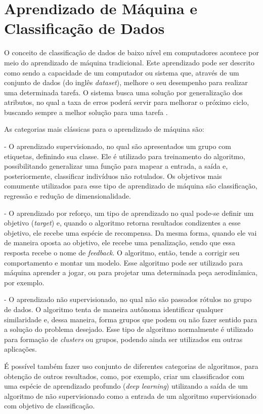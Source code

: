 \documentclass[
12pt,        %
oneside,     %
a4paper,     %
english,       %
brazil        %
%
%
]{ppgca}
\begin{document}
\section{Aprendizado de Máquina e Classificação de Dados}

O conceito de classificação de dados de baixo nível em computadores acontece por meio do aprendizado de máquina tradicional. Este aprendizado pode ser descrito como sendo a capacidade de um computador ou sistema que, através de um conjunto de dados (do inglês \textit{dataset}), melhore o seu desempenho para realizar uma determinada tarefa. O sistema busca uma solução por generalização dos atributos, no qual a taxa de erros poderá servir para melhorar o próximo ciclo, buscando sempre a melhor solução para uma tarefa \cite{mitchell1997machine}.

As categorias mais clássicas para o aprendizado de máquina são:

- O aprendizado supervisionado, no qual são apresentados um grupo com etiquetas, definindo sua classe. Ele é utilizado para treinamento do algoritmo, possibilitando generalizar uma função para mapear a entrada, a saída e, posteriormente, classificar indivíduos não rotulados. Os objetivos mais comumente utilizados para esse tipo de aprendizado de máquina são classificação, regressão e redução de dimensionalidade.

- O aprendizado por reforço, um tipo de aprendizado no qual pode-se definir um objetivo (\textit{target}) e, quando o algoritmo retorna resultados condizentes a esse objetivo, ele recebe uma espécie de recompensa. Da mesma forma, quando ele vai de maneira oposta ao objetivo, ele recebe uma penalização, sendo que essa resposta recebe o nome de \textit{feedback}. O algoritmo, então, tende a corrigir seu comportamento e montar um modelo. Esse algoritmo pode ser utilizado para máquina aprender a jogar, ou para projetar uma determinada peça aerodinâmica, por exemplo.

- O aprendizado não supervisionado, no qual não são passados rótulos no grupo de dados. O algoritmo tenta de maneira autônoma identificar qualquer similaridade e, dessa maneira, forma grupos que podem ou não fazer sentido para a solução do problema desejado. Esse tipo de algoritmo normalmente é utilizado para formação de \textit{clusters} ou grupos, podendo ainda ser utilizados em outras aplicações.

É possível também fazer uso conjunto de diferentes categorias de algoritmos, para obtenção de outros resultados, como, por exemplo, criar um classificador com uma espécie de aprendizado profundo (\textit{deep learning}) utilizando a saída de um algoritmo de não supervisionado como a entrada de um algoritmo supervisionado com objetivo de classificação.
\end{document}
